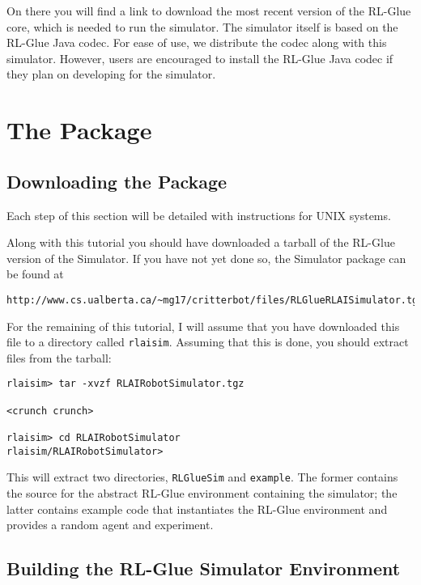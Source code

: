 \documentclass[12pt]{article}
\newcommand{\code}[1]{\texttt{#1}}
\begin{document}
On there you will find a link to download the most recent version of the RL-Glue
core, which is needed to run the simulator. The simulator itself is based
on the RL-Glue Java codec. For ease of use, we distribute the codec along
with this simulator. However, users are encouraged to install the RL-Glue
Java codec if they plan on developing for the simulator. 

\section{The Package}\label{sec:installation}

\subsection{Downloading the Package}

Each step of this section will be detailed with instructions for UNIX
systems. 

Along with this tutorial you should have downloaded a tarball of the 
RL-Glue version of the Simulator. If you have not yet done so, the Simulator
package can be found at

\begin{verbatim}
http://www.cs.ualberta.ca/~mg17/critterbot/files/RLGlueRLAISimulator.tgz
\end{verbatim}

For the remaining of this tutorial, I will assume that you have downloaded
this file to a directory called \verb+rlaisim+. Assuming that this 
is done, you should extract files from the tarball:

\begin{verbatim}
rlaisim> tar -xvzf RLAIRobotSimulator.tgz

<crunch crunch>

rlaisim> cd RLAIRobotSimulator
rlaisim/RLAIRobotSimulator>
\end{verbatim}

This will extract two directories, \code{RLGlueSim} and \code{example}.
The former contains the source for the abstract RL-Glue environment containing
the simulator; the latter contains example code that instantiates the
RL-Glue environment and provides a random agent and experiment.

\subsection{Building the RL-Glue Simulator Environment}
\end{document}
